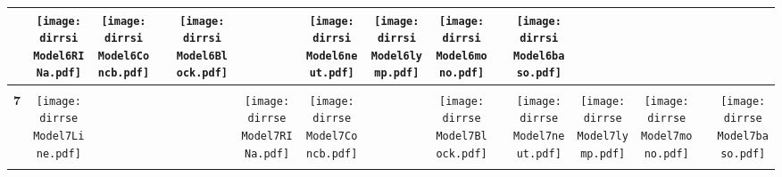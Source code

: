 \documentclass[landscape]{article}
\def \dirrsi{/run/user/1000/gvfs/smb-share:server=cyfiles.iastate.edu,share=09/22/ntyet/R/RA/Data/RFI-newdata/resultsimulation/Model6.Line.Concb.RINb.RINa.neut.lymp.mono.baso.Block/}
\def \dirrse{/run/user/1000/gvfs/smb-share:server=cyfiles.iastate.edu,share=09/22/ntyet/R/RA/Data/RFI-newdata/resultsimulation/Model7.Line.Concb.RINa.neut.lymp.mono.baso.Block/}
\begin{document}
\begin{table}
\begin{tabular}{ccccccccccccccc}
      &\texttt{[image: \\dirrsi Model6RINa.pdf]}
      &\texttt{[image: \\dirrsi Model6Concb.pdf]}
      &
      &\texttt{[image: \\dirrsi Model6Block.pdf]}
      &
      &\texttt{[image: \\dirrsi Model6neut.pdf]}
      &\texttt{[image: \\dirrsi Model6lymp.pdf]}
      &\texttt{[image: \\dirrsi Model6mono.pdf]}
      &
      &\texttt{[image: \\dirrsi Model6baso.pdf]}
     \\[3.5pt]
     \hline
     \\[3.5pt]
     {\Huge \textbf{7}} 
      &\texttt{[image: \\dirrse Model7Line.pdf]}
      &
      &
      &
      &\texttt{[image: \\dirrse Model7RINa.pdf]}
      &\texttt{[image: \\dirrse Model7Concb.pdf]}
      &
      &\texttt{[image: \\dirrse Model7Block.pdf]}
      &
      &\texttt{[image: \\dirrse Model7neut.pdf]}
      &\texttt{[image: \\dirrse Model7lymp.pdf]}
      &\texttt{[image: \\dirrse Model7mono.pdf]}
      &
      &\texttt{[image: \\dirrse Model7baso.pdf]}
     \\[3.5pt]
     \hline
     \\[3.5pt]

\end{tabular}
\end{table}
\end{document}
